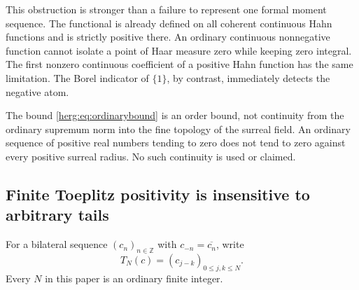 \documentclass[11pt,letterpaper]{article}
\theoremstyle{definition}
\newcommand{\Z}{\mathbb Z}\newcommand{\N}{\mathbb N}
\numberwithin{equation}{section}
\begin{document}
This obstruction is stronger than a failure to represent one formal moment sequence. The functional is already defined on all coherent continuous Hahn functions and is strictly positive there. An ordinary continuous nonnegative function cannot isolate a point of Haar measure zero while keeping zero integral. The first nonzero continuous coefficient of a positive Hahn function has the same limitation. The Borel indicator of $\{1\}$, by contrast, immediately detects the negative atom.

The bound \eqref{herg:eq:ordinarybound} is an order bound, not continuity from the ordinary supremum norm into the fine topology of the surreal field. An ordinary sequence of positive real numbers tending to zero does not tend to zero against every positive surreal radius. No such continuity is used or claimed.

\subsection{Finite Toeplitz positivity is insensitive to arbitrary tails}

For a bilateral sequence $(c_n)_{n\in\Z}$ with $c_{-n}=\overline{c_n}$, write
\begin{equation}\label{herg:eq:toeplitz}
 T_N(c)=(c_{j-k})_{0\le j,k\le N}.
\end{equation}
Every $N$ in this paper is an ordinary finite integer.
\end{document}
